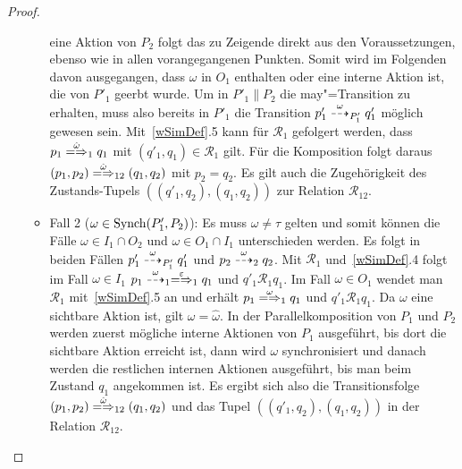 \begin{proof}
\begin{enumerate}
\begin{itemize}
          eine Aktion von $P_2$ folgt das zu Zeigende direkt aus den
          Voraussetzungen, ebenso wie in allen vorangegangenen Punkten. Somit
          wird im Folgenden davon ausgegangen, dass $\omega$ in $O_1$ enthalten
          oder eine interne Aktion ist, die von $P'_1$ geerbt wurde. Um in
          $P'_1\|P_2$ die may"=Transition zu erhalten, muss also bereits in
          $P'_1$ die Transition $p'_1 \may[\omega]_{P'_1} q'_1$ möglich gewesen
          sein. Mit~\ref{wSimDef}.5 kann für $\mathcal{R}_1$ gefolgert werden,
          dass $p_1 \weakmay[\hat{\omega}]_1 q_1$ mit $(q'_1,q_1) \in
          \mathcal{R}_1$ gilt. Für die Komposition folgt daraus $(p_1,p_2)
          \weakmay[\hat{\omega}]_{12} (q_1,q_2)$ mit $p_2=q_2$. Es gilt auch
          die Zugehörigkeit des Zustands-Tupels $((q'_1,q_2),(q_1,q_2))$ zur
          Relation $\mathcal{R}_{12}$.
        \item Fall 2 ($\omega\in\mathrm{Synch} (P'_1,P_2)$): Es muss $\omega\neq\tau$
          gelten und somit können die Fälle $\omega\in I_1\cap O_2$ und
          $\omega\in O_1\cap I_1$ unterschieden werden. Es folgt in beiden
          Fällen $p'_1\may[\omega]_{P'_1} q'_1$ und $p_2 \may[\omega]_2
          q_2$. Mit $\mathcal{R}_1$ und~\ref{wSimDef}.4 folgt im Fall
          $\omega\in I_1$ $p_1\may[\omega]_1 \weakmay[\varepsilon]_1 q_1$ und
          $q'_1 \mathcal{R}_1 q_1$. Im Fall $\omega\in O_1$ wendet man
          $\mathcal{R}_1$ mit~\ref{wSimDef}.5 an und erhält $p_1
          \weakmay[\omega]_1 q_1$ und $q'_1\mathcal{R}_1 q_1$. Da $\omega$
          eine sichtbare Aktion ist, gilt $\omega =\hat{\omega}$. In der
          Parallelkomposition von $P_1$ und $P_2$ werden zuerst mögliche
          interne Aktionen von $P_1$ ausgeführt, bis dort die sichtbare Aktion
          erreicht ist, dann wird $\omega$ synchronisiert und danach werden die
          restlichen internen Aktionen ausgeführt, bis man beim Zustand
          $q_1$ angekommen ist. Es ergibt sich also die Transitionsfolge
          $(p_1,p_2) \weakmay[\hat{\omega}]_{12} (q_1,q_2)$ und das Tupel
          $((q'_1,q_2),(q_1,q_2))$ in der Relation $\mathcal{R}_{12}$.
      \end{itemize}
  \end{enumerate}
\end{proof}

